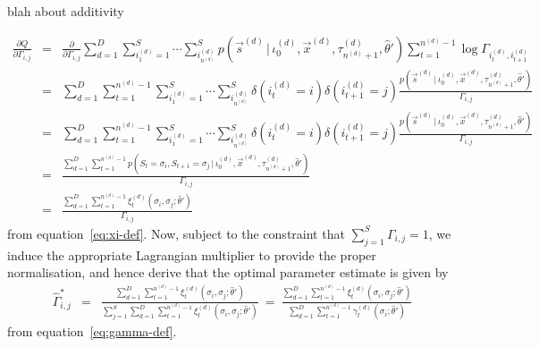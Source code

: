 \documentclass[a4paper]{article}
\begin{document}
blah about additivity

\begin{eqnarray}
  \frac{\partial Q}{\partial\Gamma_{i,j}} & = & 
  \frac{\partial}{\partial\Gamma_{i,j}}
  \sum_{d=1}^D
  \sum_{i_1^{(d)}=1}^{S}\cdots\sum_{i^{(d)}_{n^{(d)}}}^{S} 
  p(\vec{s}^{(d)}\,|\,\iota_0^{(d)},\vec{x}^{(d)},\tau_{n^{(d)}+1}^{(d)},\hat{\theta}')
  \sum_{t=1}^{n^{(d)}-1}\log\Gamma_{i_t^{(d)},i_{t+1}^{(d)}}
\nonumber\\& = &
  \sum_{d=1}^D
  \sum_{t=1}^{n^{(d)}-1}
  \sum_{i_1^{(d)}=1}^{S}\cdots\sum_{i^{(d)}_{n^{(d)}}}^{S} 
  \delta(i^{(d)}_t=i)\delta(i^{(d)}_{t+1}=j)
  \frac{p(\vec{s}^{(d)}\,|\,\iota_0^{(d)},\vec{x}^{(d)},\tau_{n^{(d)}+1}^{(d)},\hat{\theta}')}
  {\Gamma_{i,j}}
\nonumber\\& = &
  \sum_{d=1}^D
  \sum_{t=1}^{n^{(d)}-1}
  \sum_{i_1^{(d)}=1}^{S}\cdots\sum_{i^{(d)}_{n^{(d)}}}^{S} 
  \delta(i^{(d)}_t=i)\delta(i^{(d)}_{t+1}=j)
  \frac{p(\vec{s}^{(d)}\,|\,\iota_0^{(d)},\vec{x}^{(d)},\tau_{n^{(d)}+1}^{(d)},\hat{\theta}')}
  {\Gamma_{i,j}}
\nonumber\\& = &
  \frac{\sum_{d=1}^D\sum_{t=1}^{n^{(d)}-1}p(S_t=\sigma_i,S_{t+1}=\sigma_j\,|\,\iota_0^{(d)},\vec{x}^{(d)},\tau_{n^{(d)}+1}^{(d)},\hat{\theta}')}
  {\Gamma_{i,j}}
\nonumber\\& = &
  \frac{\sum_{d=1}^D\sum_{t=1}^{n^{(d)}-1} \xi_t^{(d)}(\sigma_i,\sigma_j;\hat{\theta}')}
  {\Gamma_{i,j}}
\end{eqnarray}
from equation~\eqref{eq:xi-def}. Now, subject to the constraint that $\sum_{j=1}^{S}\Gamma_{i,j}=1$, we induce the appropriate Lagrangian multiplier to
provide the proper normalisation, and hence derive that the optimal parameter estimate is given by
\begin{eqnarray}
  \hat{\Gamma}^*_{i,j} & = &
  \frac{\sum_{d=1}^D\sum_{t=1}^{n^{(d)}-1} \xi_t^{(d)}(\sigma_i,\sigma_j;\hat{\theta}')}
  {\sum_{j=1}^{S}\sum_{d=1}^D\sum_{t=1}^{n^{(d)}-1} \xi_t^{(d)}(\sigma_i,\sigma_j;\hat{\theta}')}
~=~
  \frac{\sum_{d=1}^D\sum_{t=1}^{n^{(d)}-1} \xi_t^{(d)}(\sigma_i,\sigma_j;\hat{\theta}')}
  {\sum_{d=1}^D\sum_{t=1}^{n^{(d)}-1} \gamma_t^{(d)}(\sigma_i;\hat{\theta}')}
\end{eqnarray}
from equation~\eqref{eq:gamma-def}.

\end{document}
